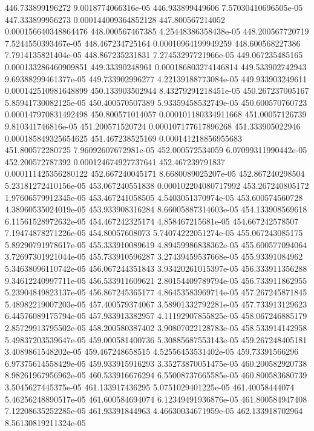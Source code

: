 {446.733899196272 9.0018774066316e-05
446.933899449606 7.57030410696505e-05
447.333899956273 0.000144009364852128
447.800567214052 0.000156640348864476
448.000567467385 4.25448386358438e-05
448.200567720719 7.5244550393467e-05
448.467234725164 0.00010964199949259
448.600568227386 7.7914135821404e-05
448.867235231831 7.27453297721966e-05
449.067235485165 0.000133286460909851
449.33390248961 0.000186803274146814
449.533902742943 9.69388299461377e-05
449.733902996277 4.22139188773084e-05
449.933903249611 0.000142510981648899
450.133903502944 8.43279291218451e-05
450.267237005167 5.85941730082125e-05
450.400570507389 5.93359458532749e-05
450.600570760723 0.000147970831492498
450.800571014057 0.000101180334911668
451.00057126739 9.810341746816e-05
451.200571520724 0.000107177617896268
451.333905022946 0.000185849325654625
451.467238525169 0.000141218856955683
451.800572280725 7.96092607672981e-05
452.000572534059 6.07099311990442e-05
452.200572787392 0.000124674927737641
452.467239791837 0.000111425356280122
452.667240045171 8.6680089025207e-05
452.867240298504 5.23181272410156e-05
453.067240551838 0.000102204080717992
453.267240805172 1.97606579912345e-05
453.467241058505 4.5403051370974e-05
453.600574560728 4.38960535024019e-05
453.933908316284 8.66005887314603e-05
454.133908569618 6.11561528972632e-05
454.467242325174 4.858467215681e-05
454.667242578507 7.19474878271226e-05
454.80057608073 5.74074222051274e-05
455.067243085175 5.89290791978617e-05
455.333910089619 4.89459986838362e-05
455.600577094064 3.72697301921044e-05
455.733910596287 3.27439459537668e-05
455.93391084962 5.34638096110742e-05
456.067244351843 3.93420261015397e-05
456.333911356288 9.34612240997711e-05
456.533911609621 2.80154409789794e-05
456.733911862955 5.23904849823137e-05
456.867245365177 4.86453583969714e-05
457.267245871845 5.48982219007203e-05
457.400579374067 3.58901332792281e-05
457.733913129623 6.44576089175794e-05
457.933913382957 4.11192907855825e-05
458.067246885179 2.85729913795502e-05
458.200580387402 3.90807022128783e-05
458.533914142958 5.49837203539647e-05
459.000581400736 5.30885687553143e-05
459.267248405181 3.4089861548202e-05
459.467248658515 4.52556453531402e-05
459.73391566296 6.97375614558429e-05
459.933915916293 3.35273870051475e-05
460.200582920738 8.98261967956962e-05
460.533916676294 6.55008737665585e-05
460.800583680739 3.5045627445375e-05
461.133917436295 5.0751029401225e-05
461.40058444074 5.46256248890517e-05
461.600584694074 6.12349491936876e-05
461.800584947408 7.12208635252285e-05
461.93391844963 4.46630034671959e-05
462.133918702964 8.56130819211324e-05
}
